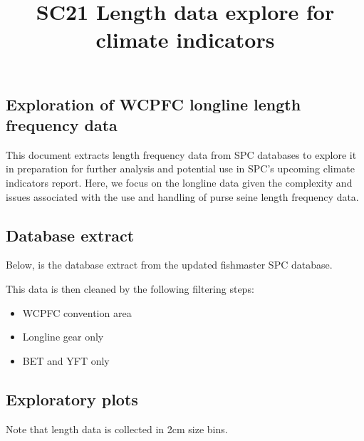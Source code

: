 \documentclass[
  letterpaper,
  DIV=11,
  numbers=noendperiod]{scrartcl}
\title{SC21 Length data explore for climate indicators}
\author{}
\date{}
\begin{document}
\maketitle
\ifdefined\Shaded\renewenvironment{Shaded}{\begin{tcolorbox}[breakable, boxrule=0pt, enhanced, frame hidden, sharp corners, interior hidden, borderline west={3pt}{0pt}{shadecolor}]}{\end{tcolorbox}}\fi

\hypertarget{exploration-of-wcpfc-longline-length-frequency-data}{%
\subsection{Exploration of WCPFC longline length frequency
data}\label{exploration-of-wcpfc-longline-length-frequency-data}}

This document extracts length frequency data from SPC databases to
explore it in preparation for further analysis and potential use in
SPC's upcoming climate indicators report. Here, we focus on the longline
data given the complexity and issues associated with the use and
handling of purse seine length frequency data.

\hypertarget{database-extract}{%
\subsection{Database extract}\label{database-extract}}

Below, is the database extract from the updated fishmaster SPC database.

This data is then cleaned by the following filtering steps:

\begin{itemize}
\item
  WCPFC convention area
\item
  Longline gear only
\item
  BET and YFT only
\end{itemize}

\hypertarget{exploratory-plots}{%
\subsection{Exploratory plots}\label{exploratory-plots}}

Note that length data is collected in 2cm size bins.
\end{document}
